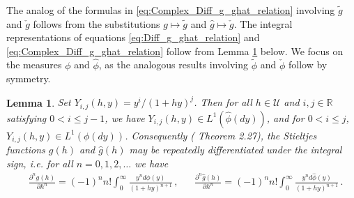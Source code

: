 \documentclass[english,12pt,jmp,graphicx]{revtex4-1}
\newtheorem{lemma}{Lemma}[section]
\newcommand{\ph}{\hat{\phi}}
\begin{document}
%
The analog of the formulas in \eqref{eq:Complex_Diff_g_ghat_relation}
involving $\tilde{g}$ and $\check{g}$ follows from the
substitutions $g\mapsto\tilde{g}$ and $\hat{g}\mapsto\check{g}$. 
The integral representations of equations
\eqref{eq:Diff_g_ghat_relation} and \eqref{eq:Complex_Diff_g_ghat_relation}
follow from Lemma \ref{lem:L1_Yij} below. We focus on the
measures $\phi$ and $\ph$, as the analogous results involving $\tilde{\phi}$
and $\check{\phi}$ follow by symmetry.

\begin{lemma}\label{lem:L1_Yij}  
  Set $Y_{i,j}(h,y)=y^i/(1+hy)^j$. Then for all $h\in\mathcal{U}$ and
  $i,j\in\mathbb{R}$ satisfying $0<i\leq j-1$, we have
  $Y_{i,j}(h,y)\in L^1(\ph(dy))$, and for $0<i\leq j$,
  $Y_{i,j}(h,y)\in L^1(\phi(dy))$. Consequently (\cite{Folland:95} Theorem
  2.27), the Stieltjes functions $g(h)$ and $\hat{g}(h)$ may be
  repeatedly differentiated under the integral sign, i.e. for all
  $n=0,1,2,\ldots$ we have 
  \begin{align}\label{eq:Integral_rep_g_ghat}
    &\frac{\partial^ng(h)}{\partial h^n}%
                     =(-1)^nn!\int_0^\infty\frac{y^nd\phi(y)}{(1+hy)^{n+1}}\,,
         &&
    \frac{\partial^n\hat{g}(h)}{\partial h^n}%
                     =(-1)^nn!\int_0^\infty\frac{y^nd\ph(y)}{(1+hy)^{n+1}}\,.
  \end{align}
\end{lemma}
%
\end{document}
